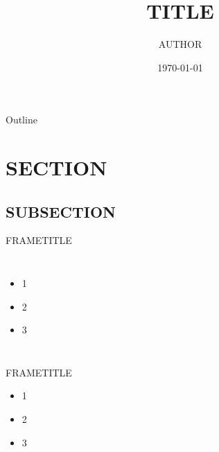 \documentclass{beamer}
\title{TITLE}
\author{AUTHOR}
\date{\today}
\begin{document}

\frame{\titlepage}

\section[Outline]{}
\begin{frame}{Outline}
  \tableofcontents
\end{frame}

\section{SECTION}
\subsection{SUBSECTION}

\begin{frame}{FRAMETITLE}
  \begin{columns}[c]
    \column{2.0in}
      \begin{itemize}
        \item 1 
        \item 2
        \item 3
      \end{itemize}

    \column{2.0in}
  \end{columns}
\end{frame}

\begin{frame}{FRAMETITLE}
  \begin{itemize}
      \item 1 
      \item 2
      \item 3
  \end{itemize}
  \begin{figure}
    \centering
  \end{figure}
\end{frame}

\end{document}
